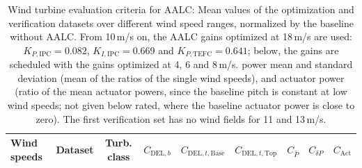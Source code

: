 \begin{table}[h]
    \centering
    \caption[Wind turbine evaluation criteria for AALC: Mean values of the optimization and verification datasets over wind speed ranges]{\label{tabone} Wind turbine evaluation criteria for AALC: Mean values of the optimization and verification datasets over different wind speed ranges, normalized by the baseline without AALC. From 10\,m/s on, the AALC gains optimized at 18\,m/s are used: $K_{P,\text{IPC}} = 0.082$, $K_{I,\text{IPC}} = 0.669$ and $K_{P,\text{TEFC}} = 0.641$; below, the gains are scheduled with the gains optimized at 4, 6 and 8\,m/s.  power mean and standard deviation (mean of the ratios of the single wind speeds), and actuator power (ratio of the mean actuator powers, since the baseline pitch is constant at low wind speeds; not given below rated, where the baseline actuator power is close to zero). The first verification set has no wind fields for 11 and 13\,m/s.}
    \begin{tabular}{@{}l*{8}{c}@{}}
        \toprule
        Wind speeds & Dataset & Turb. class & $C_{\text{DEL},b}$ & $C_{\text{DEL},t,\text{Base}}$ & $C_{\text{DEL},t,\text{Top}}$ & $C_{\bar{P}}$ & $C_{\delta P}$ & $C_{\text{Act}}$ \\
        \midrule

\end{tabular}
\end{table}
